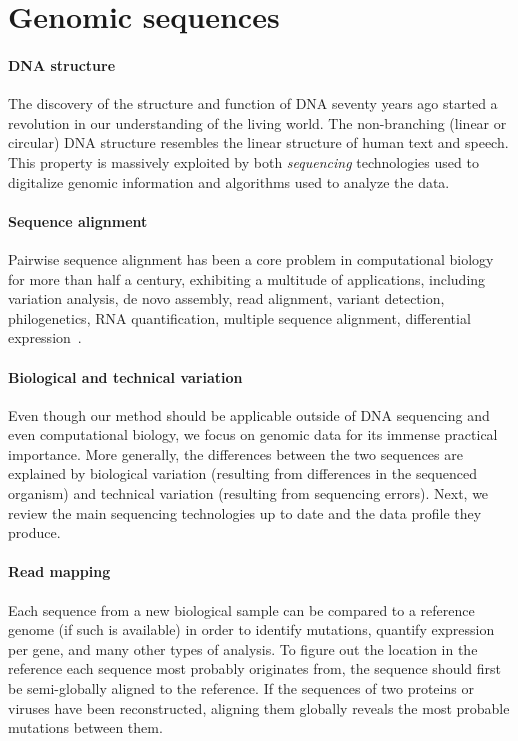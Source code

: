 \section*{Genomic sequences}

\paragraph{DNA structure}
The discovery of the structure and function of DNA\citep{watson1953structure}
seventy years ago started a revolution in our understanding of the living world.
The non-branching (linear or circular) DNA structure resembles the linear
structure of human text and speech. This property is massively exploited by both
\emph{sequencing} technologies used to digitalize genomic information and
algorithms used to analyze the data.

\paragraph{Sequence alignment}
Pairwise sequence alignment has been a core problem in computational biology for
more than half a century, exhibiting a multitude of applications, including
variation analysis, de novo assembly, read alignment, variant detection,
philogenetics, RNA quantification, multiple sequence alignment, differential
expression~\citep{prjibelski2018sequence}.

\paragraph{Biological and technical variation}
Even though our method should be applicable outside of DNA sequencing and even
computational biology, we focus on genomic data for its immense practical
importance. More generally, the differences between the two sequences are
explained by biological variation (resulting from differences in the sequenced
organism) and technical variation (resulting from sequencing errors). Next, we
review the main sequencing technologies up to date and the data profile they
produce.

\paragraph{Read mapping}
Each sequence from a new biological sample can be compared to a reference genome
(if such is available) in order to identify mutations, quantify expression per
gene, and many other types of analysis. To figure out the location in the
reference each sequence most probably originates from, the sequence should first
be semi-globally aligned to the reference. If the sequences of two proteins or
viruses have been reconstructed, aligning them globally reveals the most
probable mutations between them.

